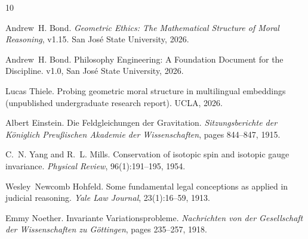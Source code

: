 \documentclass[12pt,letterpaper]{article}
\theoremstyle{definition}
\begin{document}
\begin{thebibliography}{10}

Andrew~H. Bond.
\newblock \emph{Geometric Ethics: The Mathematical Structure of Moral Reasoning}, v1.15.
\newblock San Jos\'{e} State University, 2026.

Andrew~H. Bond.
\newblock Philosophy Engineering: A Foundation Document for the Discipline.
\newblock v1.0, San Jos\'{e} State University, 2026.

Lucas Thiele.
\newblock Probing geometric moral structure in multilingual embeddings (unpublished undergraduate research report).
\newblock UCLA, 2026.

Albert Einstein.
\newblock Die Feldgleichungen der Gravitation.
\newblock \emph{Sitzungsberichte der K\"{o}niglich Preu{\ss}ischen Akademie der Wissenschaften}, pages 844--847, 1915.

C.~N. Yang and R.~L. Mills.
\newblock Conservation of isotopic spin and isotopic gauge invariance.
\newblock \emph{Physical Review}, 96(1):191--195, 1954.

Wesley~Newcomb Hohfeld.
\newblock Some fundamental legal conceptions as applied in judicial reasoning.
\newblock \emph{Yale Law Journal}, 23(1):16--59, 1913.

Emmy Noether.
\newblock Invariante Variationsprobleme.
\newblock \emph{Nachrichten von der Gesellschaft der Wissenschaften zu G\"{o}ttingen}, pages 235--257, 1918.

\end{thebibliography}
\end{document}

